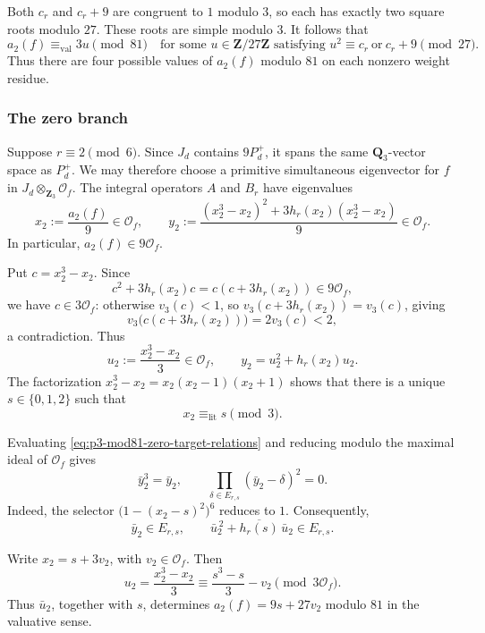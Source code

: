 \documentclass[11pt]{article}
\theoremstyle{plain}
\theoremstyle{definition}
\theoremstyle{remark}
\numberwithin{equation}{section}
\begin{document}
Both \(c_r\) and \(c_r+9\) are congruent to \(1\) modulo \(3\), so each has exactly two square roots modulo \(27\). These roots are simple modulo \(3\). It follows that \begin{equation} a_2(f)\equiv_{\mathrm{val}}3u\pmod{81} \quad\text{for some }u\in\mathbf Z/27\mathbf Z \text{ satisfying } u^2\equiv c_r\ \text{or}\ c_r+9\pmod{27}. \label{eq:p3-mod81-nonzero-T2} \end{equation} Thus there are four possible values of \(a_2(f)\) modulo \(81\) on each nonzero weight residue. 

\subsubsection{The zero branch}

Suppose \(r\equiv2\pmod6\). Since \(J_d\) contains \(9P_d^+\), it spans the same \(\mathbf Q_3\)-vector space as \(P_d^+\). We may therefore choose a primitive simultaneous eigenvector for \(f\) in \(J_d\otimes_{\mathbf Z_3}\mathcal O_f\). The integral operators \(A\) and \(B_r\) have eigenvalues \[ x_2:=\frac{a_2(f)}9\in\mathcal O_f, \qquad y_2:=\frac{(x_2^3-x_2)^2+ 3h_r(x_2)(x_2^3-x_2)}9\in\mathcal O_f. \] In particular, \(a_2(f)\in9\mathcal O_f\). 

Put \(c=x_2^3-x_2\). Since \[ c^2+3h_r(x_2)c = c(c + 3h_r(x_2))\in9\mathcal O_f, \] we have \(c\in3\mathcal O_f\): otherwise \(v_3(c)<1\), so \(v_3(c+3h_r(x_2))=v_3(c)\), giving \[ v_3\bigl(c(c+3h_r(x_2))\bigr)=2v_3(c)<2, \] a contradiction. Thus \[ u_2:=\frac{x_2^3-x_2}{3}\in\mathcal O_f, \qquad y_2=u_2^2+h_r(x_2)u_2. \] The factorization \(x_2^3-x_2=x_2(x_2-1)(x_2+1)\) shows that there is a unique \(s\in\{0,1,2\}\) such that \[ x_2\equiv_{\mathrm{lit}}s\pmod3. \]

Evaluating \eqref{eq:p3-mod81-zero-target-relations} and reducing modulo the maximal ideal of \(\mathcal O_f\) gives \[ \bar y_2^3=\bar y_2, \qquad \prod_{\delta\in E_{r,s}}(\bar y_2-\delta)^2=0. \] Indeed, the selector \(\bigl(1-(x_2-s)^2\bigr)^6\) reduces to \(1\). Consequently, \[ \bar y_2\in E_{r,s}, \qquad \bar u_2^{\,2}+\overline{h_r(s)}\,\bar u_2 \in E_{r,s}. \]

Write \(x_2=s+3v_2\), with \(v_2\in\mathcal O_f\). Then \[ u_2=\frac{x_2^3-x_2}{3} \equiv \frac{s^3-s}{3}-v_2 \pmod{3\mathcal O_f}. \] Thus \(\bar u_2\), together with \(s\), determines \(a_2(f)=9s+27v_2\) modulo \(81\) in the valuative sense. 
\end{document}
